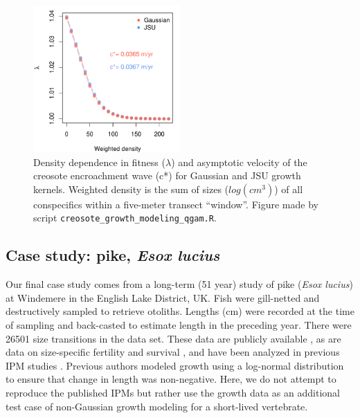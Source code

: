 \documentclass[12pt]{article}
\begin{document}
\begin{spacing}{1.35}
	\begin{figure}[tbp]
		\centering
		\includegraphics[width=0.5\textwidth]{figures/creosote_DD_lambda.pdf}
		\caption{Density dependence in fitness ($\lambda$) and asymptotic velocity of the creosote encroachment wave (c*) for Gaussian and JSU growth kernels. Weighted density is the sum of sizes ($log(cm^3)$) of all conspecifics within a five-meter transect ``window''. Figure made by script \texttt{creosote\_growth\_modeling\_qgam.R}.}
		\label{fig:creosote_lambda_cstar}
	\end{figure}
	
	\subsection{Case study: pike, \emph{Esox lucius}}
	\label{sec:pike}
	Our final case study comes from a long-term (51 year) study of pike (\emph{Esox lucius}) at Windemere in the English Lake District, UK. 
	Fish were gill-netted and destructively sampled to retrieve otoliths. 
	Lengths (cm) were recorded at the time of sampling and back-casted to estimate length in the preceding year. 
	There were 26501 size transitions in the data set. 
	These data are publicly available \citep{winfield2013pikegrowth}, as are data on size-specific fertility and survival \citep{winfield2013pikesurvival,winfield2013pikefecundity}, and have been analyzed in previous IPM studies \citep{vindenes2014effects,stubberud2019effects}. 
	Previous authors modeled growth using a log-normal distribution to ensure that change in length was non-negative. 
	Here, we do not attempt to reproduce the published IPMs but rather use the growth data as an additional test case of non-Gaussian growth modeling for a short-lived vertebrate. 
	

\end{spacing}
\end{document}
